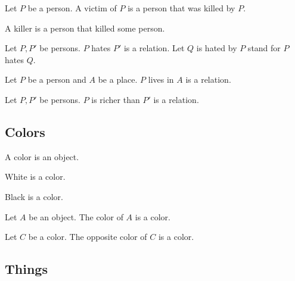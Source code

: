 \documentclass{article}
\begin{document}
\begin{definition*}[forthel]
  Let $P$ be a person.
  A victim of $P$ is a person that was killed by $P$.
\end{definition*}

\begin{definition*}[forthel]
  A killer is a person that killed some person.
\end{definition*}

\begin{signature*}[forthel]
  Let $P, P'$ be persons.
  $P$ hates $P'$ is a relation.
  Let $Q$ is hated by $P$ stand for $P$ hates $Q$.
\end{signature*}

\begin{signature*}[forthel]
  Let $P$ be a person and $A$ be a place.
  $P$ lives in $A$ is a relation.
\end{signature*}

\begin{signature*}[forthel]
  Let $P, P'$ be persons.
  $P$ is richer than $P'$ is a relation.
\end{signature*}


\subsection{Colors}

\begin{signature*}[forthel]
  A color is an object.
\end{signature*}

\begin{signature*}[forthel]
  White is a color.
\end{signature*}

\begin{signature*}[forthel]
  Black is a color.
\end{signature*}

\begin{signature*}[forthel]
  Let $A$ be an object.
  The color of $A$ is a color.
\end{signature*}

\begin{signature*}[forthel]
  Let $C$ be a color.
  The opposite color of $C$ is a color.
\end{signature*}


\subsection{Things}
\end{document}
